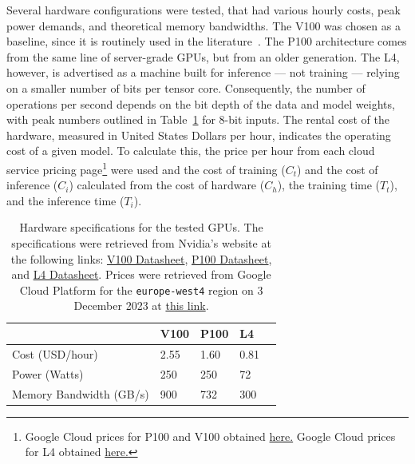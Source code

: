 \documentclass[conference]{IEEEtran}
\begin{document}
Several hardware configurations were tested, that had various hourly costs, peak power demands, and theoretical memory bandwidths. The V100 was chosen as a baseline, since it is routinely used in the literature~\cite{svedin2021benchmarking,xu2018deep}. The P100 architecture comes from the same line of server-grade GPUs, but from an older generation. The L4, however, is advertised as a machine built for inference --- not training --- relying on a smaller number of bits per tensor core. Consequently, the number of operations per second depends on the bit depth of the data and model weights, with peak numbers outlined in Table~\ref{tab:hardware} for 8-bit inputs. The rental cost of the hardware, measured in United States Dollars per hour, indicates the operating cost of a given model. To calculate this, the price per hour from each cloud service pricing page\footnote{Google Cloud prices for P100 and V100 obtained \href{https://cloud.google.com/compute/gpus-pricing}{here.} Google Cloud prices for L4 obtained \href{https://cloud.google.com/compute/vm-instance-pricing\#accelerator-optimised}{here.}} were used and the cost of training ($C_{t}$) and the cost of inference ($C_{i}$) calculated from the cost of hardware ($C_{h}$), the training time ($T_{t}$), and the inference time ($T_{i}$).
\begin{table}[h]
    \centering
    \begin{tabular}{lllll}
    \toprule
                            & V100   & P100   & L4    &  \\
    \midrule
    Cost (USD/hour)         & 2.55   & 1.60   & 0.81   &  \\
    Power (Watts)           & 250    & 250    & 72    &  \\
    Memory Bandwidth (GB/s) & 900    & 732    & 300   &  \\
    \bottomrule
    \end{tabular}
    \caption{Hardware specifications for the tested GPUs. The specifications were retrieved from Nvidia's website at the following links: 
    \href{https://images.nvidia.com/content/technologies/volta/pdf/volta-v100-datasheet-update-us-1165301-r5.pdf}{V100 Datasheet},
    \href{https://images.nvidia.com/content/tesla/pdf/nvidia-tesla-p100-PCIe-datasheet.pdf}{P100 Datasheet}, and
    \href{https://nvdam.widen.net/s/rvq98gbwsw/l4-datasheet-2595652}{L4 Datasheet}. Prices were retrieved from Google Cloud Platform for the \texttt{europe-west4} region on 3 December 2023 at \href{https://cloud.google.com/pricing/list}{this link}.
    }
    \label{tab:hardware}
\end{table}
\end{document}
